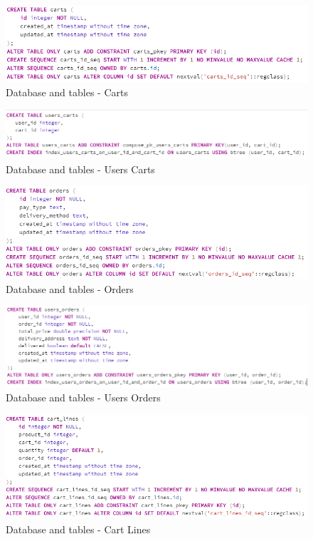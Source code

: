 \documentclass{article}
\begin{document}
\begin{figure}
\centering
\includegraphics[scale=0.8]{7}
\caption{Database and tables - Carts}
\end{figure}
\begin{figure}
\centering
\includegraphics[scale=0.8]{8}
\caption{Database and tables - Users Carts}
\end{figure}
\begin{figure}
\centering
\includegraphics[scale=0.8]{9}
\caption{Database and tables - Orders}
\end{figure}
\begin{figure}
\centering
\includegraphics[scale=0.8]{10}
\caption{Database and tables - Users Orders}
\end{figure}
\begin{figure}
\centering
\includegraphics[scale=0.8]{11}
\caption{Database and tables - Cart Lines}
\end{figure}
\end{document}
